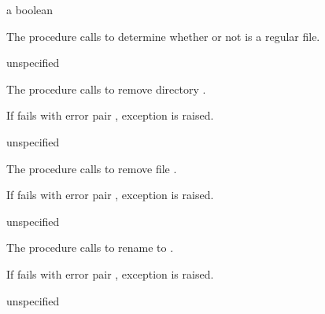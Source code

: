 \begin{procedure}
\end{procedure}
\returns{} a boolean

The  procedure calls 
to determine whether or not  is a regular file.

\begin{procedure}
\end{procedure}
\returns{} unspecified

The  procedure calls
 to remove directory .

If  fails with error pair
, exception  is raised.

\begin{procedure}
\end{procedure}
\returns{} unspecified

The  procedure calls  to remove
file .

If  fails with error pair , exception  is raised.

\begin{procedure}
\end{procedure}
\returns{} unspecified

The  procedure calls  to rename
 to .

If  fails with error pair , exception  is raised.

\begin{procedure}
\end{procedure}
\returns{} unspecified

